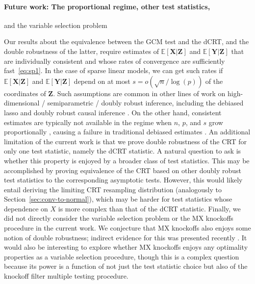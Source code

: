 \documentclass[aos]{imsart}
\theoremstyle{plain}
\theoremstyle{remark}
\newcommand{\E}{\mathbb E}								%
\newcommand{\prx}{\bm X}								%
\newcommand{\srx}{X}									%
\newcommand{\prz}{\bm Z}								%
\newcommand{\pry}{{\bm Y}}								%
\begin{document}
\paragraph*{Future work: The proportional regime, other test statistics,} and the variable selection problem

Our results about the equivalence between the GCM test and the dCRT, and the double robustness of the latter, require estimates of $\E[\prx|\prz]$ and $\E[\pry|\prz]$ that are individually consistent and whose rates of convergence are sufficiently fast~\eqref{eq:sp1}. In the case of sparse linear models, we can get such rates if $\E[\prx|\prz]$ and $\E[\pry|\prz]$ depend on at most $s = o(\sqrt{n}/\log(p))$ of the coordinates of $\prz$. Such assumptions are common in other lines of work on high-dimensional / semiparametric / doubly robust inference, including the debiased lasso \citep{VanDeGeer2014, ZZ14, Javanmard2014, Ning2017, Jankova2018a} and doubly robust causal inference \citep{BetH14, Chernozhukov2018}. On the other hand, consistent estimates are typically not available in the regime when $n$, $p$, and $s$ grow proportionally \citep{Bayati2011}, causing a failure in traditional debiased estimates \citep{Celentano2021}. An additional limitation of the current work is that we prove double robustness of the CRT for only one test statistic, namely the dCRT statistic. A natural question to ask is whether this property is enjoyed by a broader class of test statistics. This may be accomplished by proving equivalence of the CRT based on other doubly robust test statistics to the corresponding asymptotic tests. However, this would likely entail deriving the limiting CRT resampling distribution (analogously to Section~\ref{sec:conv-to-normal}), which may be harder for test statistics whose dependence on $\srx$ is more complex than that of the dCRT statistic. Finally, we did not directly consider the variable selection problem or the MX knockoffs procedure in the current work. We conjecture that MX knockoffs also enjoys some notion of double robustness; indirect evidence for this was presented recently \citep{Fan2023}. It would also be interesting to explore whether MX knockoffs enjoys any optimality properties as a variable selection procedure, though this is a complex question because its power is a function of not just the test statistic choice but also of the knockoff filter multiple testing procedure.
\end{document}
